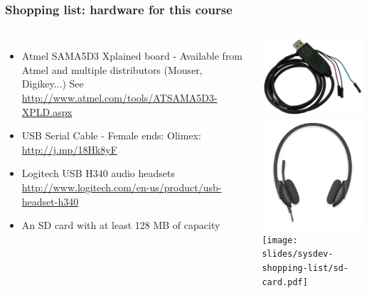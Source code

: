 \begin{frame}
\frametitle{Shopping list: hardware for this course}
  \begin{columns}
    \footnotesize
    \begin{itemize}
      \item Atmel SAMA5D3 Xplained board - Available from Atmel and
 	    multiple distributors (Mouser, Digikey...)
	    See \url{http://www.atmel.com/tools/ATSAMA5D3-XPLD.aspx}
      \item USB Serial Cable - Female ends:
	    Olimex: \url{http://j.mp/18Hk8yF} \\
      \item Logitech USB H340 audio headsets
	    \url{http://www.logitech.com/en-us/product/usb-headset-h340} \\
      \item An SD card with at least 128 MB of capacity
    \end{itemize}
    \includegraphics[height=0.20\textheight]{slides/sysdev-shopping-list/usb-serial-cable-female.png} \\
    \includegraphics[height=0.15\textheight]{slides/sysdev-shopping-list/logitech-h340.png} \\
    \texttt{[image: slides/sysdev-shopping-list/sd-card.pdf]}
  \end{columns}
\end{frame}
